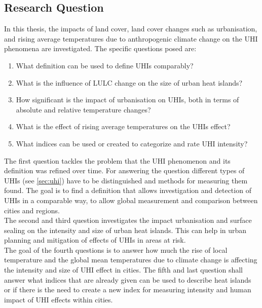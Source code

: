 \documentclass[12pt,a4paper, english,twoside]{scrartcl}
\begin{document}
 \subsection{Research Question}
  In this thesis, the impacts of land cover, land cover changes such as urbanisation, and rising average temperatures due to anthropogenic climate change on the \gls{UHI} phenomena are investigated.
  The specific questions posed are:
  \begin{enumerate}
    \item What definition can be used to define \glspl{UHI} comparably?\label{q1}
    \item What is the influence of \gls{LULC} change on the size of urban heat islands?\label{q2}
    \item How significant is the impact of urbanisation on \glspl{UHI}, both in terms of absolute and relative temperature changes?\label{q3}
    \item What is the effect of rising average temperatures on the \glspl{UHI} effect?\label{q4}
    \item What indices can be used or created to categorize and rate \gls{UHI} intensity?\label{q5}
  \end{enumerate}
  The first question tackles the problem that the \gls{UHI} phenomenon and its definition was refined over time. 
  For answering the question different types of \glspl{UHI} (see \cref{sec:uhi}) have to be distinguished and methods for measuring them found. 
  The goal is to find a definition that allows investigation and detection of \glspl{UHI} in a comparable way, to allow global measurement and comparison between cities and regions.\\ 
  The second and third question investigates the impact urbanisation and surface sealing on the intensity and size of urban heat islands. 
  This can help in urban planning and mitigation of effects of \glspl{UHI} in areas at risk.\\ 
  The goal of the fourth questions is to answer how much the rise of local temperature and the global mean temperatures due to climate change is affecting the intensity and size of \gls{UHI} effect in cities. 
  The fifth and last question shall answer what indices that are already given can be used to describe heat islands or if there is the need to create a new index for measuring intensity and human impact of \gls{UHI} effects within cities.
\end{document}
